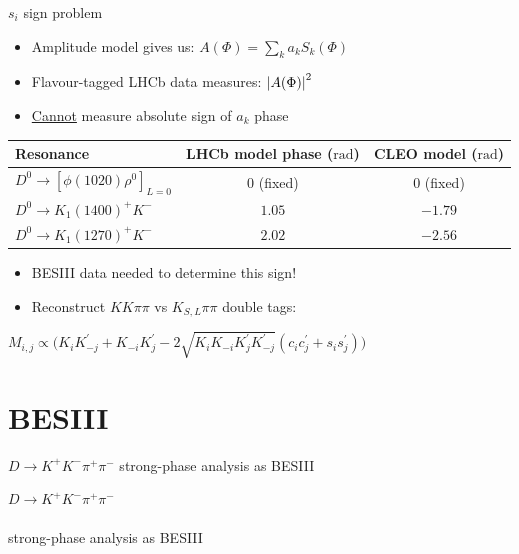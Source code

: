 \documentclass{beamer}
\begin{document}
\begin{frame}{$s_i$ sign problem}
  \begin{itemize}
    \setlength\itemsep{0.5em}
    \item{Amplitude model gives us: $A(\Phi) = \sum_ka_kS_k(\Phi)$}
    \item{Flavour-tagged LHCb data measures: $\abs{A(\Phi)}^2$}
    \item{\underline{Cannot} measure absolute sign of $a_k$ phase}
  \end{itemize}
  \vspace{0.4cm}
  \begin{tabular}{l|c|c}
    Resonance                           & LHCb model phase ($\si{\radian}$) & CLEO model ($\si{\radian}$) \\
    \hline
    $D^0\to[\phi(1020)\rho^0]_{L = 0}$  & $0$ (fixed)                       & $0$ (fixed) \\
    $D^0\to K_1(1400)^+K^-$             & $1.05$                            & $-1.79$ \\
    $D^0\to K_1(1270)^+K^-$             & $2.02$                            & $-2.56$ \\
    \hline
  \end{tabular}
  \vspace{0.4cm}
  \begin{itemize}
    \setlength\itemsep{0.5em}
    \item{BESIII data needed to determine this sign!}
    \item{Reconstruct $KK\pi\pi$ vs $K_{S,L}\pi\pi$ double tags:}
  \end{itemize}
  \begin{center}
    $M_{i, j}\propto\big(K_iK^\prime_{-j} + K_{-i}K^\prime_j - 2\sqrt{K_iK_{-i}K^\prime_jK^\prime_{-j}}(c_ic^\prime_j + s_is^\prime_j)\big)$
  \end{center}
\end{frame}

\section{BESIII}

\begin{frame}{$D\to K^+K^-\pi^+\pi^-$ strong-phase analysis as BESIII}
  \begin{center}
    {\huge $D\to K^+K^-\pi^+\pi^-$ \\~\\strong-phase analysis as BESIII}
  \end{center}
\end{frame}
\end{document}
